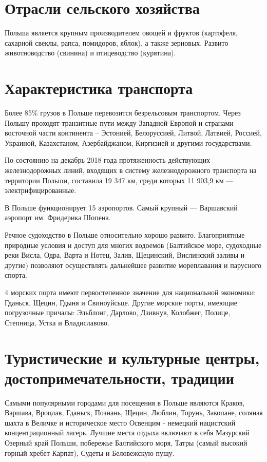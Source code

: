 \documentclass[12pt]{article}
\begin{document}
\section{Отрасли сельского хозяйства}
Польша является крупным производителем овощей и фруктов (картофеля, сахарной свеклы, рапса, помидоров, яблок), а также зерновых.
Развито животноводство (свинина) и птицеводство (курятина).

\section{Характеристика транспорта}
Более 85\% грузов в Польше перевозится безрельсовым транспортом.
Через Польшу проходят транзитные пути между Западной Европой и странами восточной части континента – Эстонией, Белоруссией, Литвой, Латвией, Россией, Украиной, Казахстаном, Азербайджаном, Киргизией и другими государствами.

По состоянию на декабрь 2018 года протяженность действующих железнодорожных линий, входящих в систему железнодорожного транспорта на территории Польши, составила 19 347 км, среди которых 11 903,9 км — электрифицированные.

В Польше функционирует 15 аэропортов. Самый крупный — Варшавский аэропорт им. Фридерика Шопена.

Речное судоходство в Польше относительно хорошо развито. Благоприятные природные условия и доступ для многих водоемов (Балтийское море, судоходные реки Висла, Одра, Варта и Нотец, Залив, Щецинский, Вислинский заливы и другие) позволяют осуществлять дальнейшее развитие мореплавания и парусного спорта.

4 морских порта имеют первостепенное значение для национальной экономики: Гданьск, Щецин, Гдыня и Свиноуйсьце.
Другие морские порты, имеющие погрузочные причалы: Эльблонг, Дарлово, Дзивнув, Колобжег, Полице, Степница, Устка и Владиславово.

\section{Туристические и культурные центры, достопримечательности, традиции}
Самыми популярными городами для посещения в Польше являются Краков, Варшава, Вроцлав, Гданьск, Познань, Щецин, Люблин, Торунь, Закопане, соляная шахта в Величке и историческое место Освенцим - немецкий нацистский концентрационный лагерь.
Лучшие места отдыха включают в себя Мазурский Озерный край Польши, побережье Балтийского моря, Татры (самый высокий горный хребет Карпат), Судеты и Беловежскую пущу.
\end{document}
